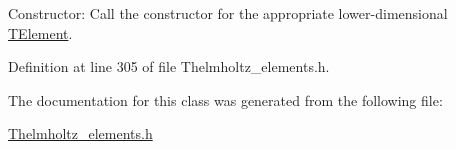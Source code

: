 Constructor\+: Call the constructor for the appropriate lower-\/dimensional \hyperlink{classoomph_1_1TElement}{T\+Element}. 



Definition at line 305 of file Thelmholtz\+\_\+elements.\+h.



The documentation for this class was generated from the following file\+:\begin{DoxyCompactItemize}
\item 
\hyperlink{Thelmholtz__elements_8h}{Thelmholtz\+\_\+elements.\+h}\end{DoxyCompactItemize}
